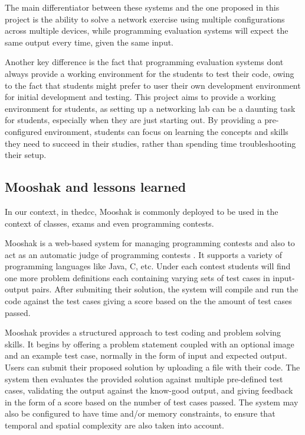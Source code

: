     The main differentiator between these systems and the one proposed in this project is the ability to solve a network 
    exercise using multiple configurations across multiple devices, while programming evaluation systems will expect
    the same output every time, given the same input.
    
    Another key difference is the fact that programming evaluation systems dont always provide a working environment for the 
    students to test their code, owing to the fact that students might prefer to user their own development environment for 
    initial development and testing. This project aims to provide a working environment for students, as setting up a 
    networking lab can be a daunting task for students, especially when they are just starting out. By providing a pre-configured
    environment, students can focus on learning the concepts and skills they need to succeed in their studies, rather than
    spending time troubleshooting their setup.

    \subsection{Mooshak and lessons learned}

        In our context, in the\ac{dcc}, Mooshak is commonly deployed to be used in the context of classes, exams and even 
        programming contests.

        Mooshak is a web-based system for managing programming contests and also to act as an automatic judge of programming 
        contests \cite{Leal2003567}. It supports a variety of programming languages like Java, C, etc. Under each contest students 
        will find one more problem definitions each containing varying sets of test cases in input-output pairs. After submiting 
        their solution, the system will compile and run the code against the test cases giving a score based on the the amount of 
        test cases passed.

        Mooshak provides a structured approach to test coding and problem solving skills. It begins by offering a problem statement 
        coupled with an optional image and an example test case, normally in the form of input and expected output.
        Users can submit their proposed solution by uploading a file with their code. The system then evaluates the provided solution 
        against multiple pre-defined test cases, validating the output against the know-good output, and giving feedback in the form of 
        a score based on the number of test cases passed. The system may also be configured to have time and/or memory constraints, 
        to ensure that temporal and spatial complexity are also taken into account.
    
